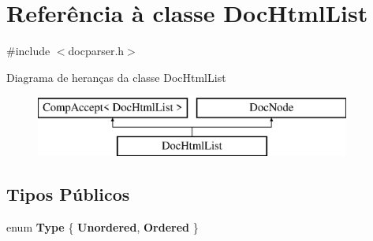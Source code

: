 \hypertarget{class_doc_html_list}{\section{Referência à classe Doc\-Html\-List}
\label{class_doc_html_list}
}


{\ttfamily \#include $<$docparser.\-h$>$}

Diagrama de heranças da classe Doc\-Html\-List\begin{figure}[H]
\begin{center}
\leavevmode
\includegraphics[height=2.000000cm]{class_doc_html_list}
\end{center}
\end{figure}
\subsection*{Tipos Públicos}
\begin{DoxyCompactItemize}
\item 
enum {\bfseries Type} \{ {\bfseries Unordered}, 
{\bfseries Ordered}
 \}
\end{DoxyCompactItemize}
